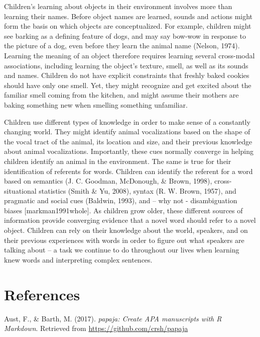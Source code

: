 \documentclass[english,floatsintext,man]{apa6}
\theoremstyle{definition}
\theoremstyle{definition}
\theoremstyle{definition}
\theoremstyle{remark}
\begin{document}
Children's learning about objects in their environment involves more
than learning their names. Before object names are learned, sounds and
actions might form the basis on which objects are conceptualized. For
example, children might see barking as a defining feature of dogs, and
may say bow-wow in response to the picture of a dog, even before they
learn the animal name (Nelson, 1974). Learning the meaning of an object
therefore requires learning several cross-modal associations, including
learning the object's texture, smell, as well as its sounds and names.
Children do not have explicit constraints that freshly baked cookies
should have only one smell. Yet, they might recognize and get excited
about the familiar smell coming from the kitchen, and might assume their
mothers are baking something new when smelling something unfamiliar.

Children use different types of knowledge in order to make sense of a
constantly changing world. They might identify animal vocalizations
based on the shape of the vocal tract of the animal, its location and
size, and their previous knowledge about animal vocalizations.
Importantly, these cues normally converge in helping children identify
an animal in the environment. The same is true for their identification
of referents for words. Children can identify the referent for a word
based on semantics (J. C. Goodman, McDonough, \& Brown, 1998),
cross-situational statistics (Smith \& Yu, 2008), syntax (R. W. Brown,
1957), and pragmatic and social cues (Baldwin, 1993), and -- why not -
disambiguation biases {[}markman1991whole{]}. As children grow older,
these different sources of information provide converging evidence that
a novel word should refer to a novel object. Children can rely on their
knowledge about the world, speakers, and on their previous experiences
with words in order to figure out what speakers are talking about -- a
task we continue to do throughout our lives when learning knew words and
interpreting complex sentences.

\newpage

\section{References}\label{references}

\setlength{\parindent}{-0.5in} \setlength{\leftskip}{0.5in}

\hypertarget{refs}{}
\hypertarget{ref-R-papaja}{}
Aust, F., \& Barth, M. (2017). \emph{papaja: Create APA manuscripts with
R Markdown}. Retrieved from \url{https://github.com/crsh/papaja}
\end{document}
